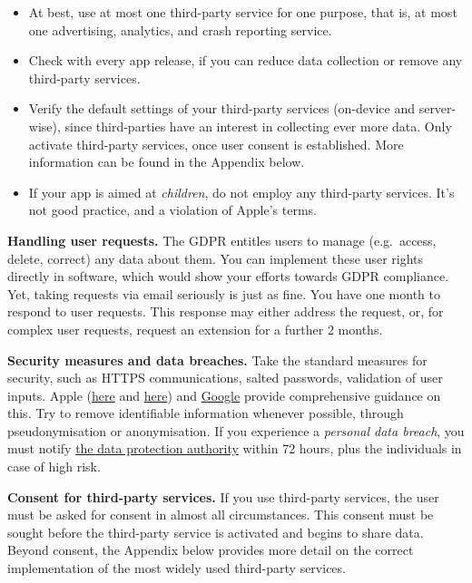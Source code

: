 \documentclass[
]{book}
\providecommand{\tightlist}{%
  \setlength{\itemsep}{0pt}\setlength{\parskip}{0pt}}
\begin{document}
\begin{itemize}
\tightlist
\item
  At best, use at most one third-party service for one purpose, that is, at most one advertising, analytics, and crash reporting service.
\item
  Check with every app release, if you can reduce data collection or remove any third-party services.
\item
  Verify the default settings of your third-party services (on-device and server-wise), since third-parties have an interest in collecting ever more data. Only activate third-party services, once user consent is established. More information can be found in the Appendix below.
\item
  If your app is aimed at \emph{children}, do not employ any third-party services. It's not good practice, and a violation of Apple's terms.
\end{itemize}

\textbf{Handling user requests.} The GDPR entitles users to manage (e.g.~access, delete, correct) any data about them. You can implement these user rights directly in software, which would show your efforts towards GDPR compliance. Yet, taking requests via email seriously is just as fine. You have one month to respond to user requests. This response may either address the request, or, for complex user requests, request an extension for a further 2 months.

\textbf{Security measures and data breaches.} Take the standard measures for security, such as HTTPS communications, salted passwords, validation of user inputs. Apple (\href{https://developer.apple.com/documentation/security}{here} and \href{https://developer.apple.com/library/archive/documentation/Security/Conceptual/SecureCodingGuide}{here}) and \href{https://developer.android.com/training/articles/security-tips}{Google} provide comprehensive guidance on this. Try to remove identifiable information whenever possible, through pseudonymisation or anonymisation. If you experience a \emph{personal data breach}, you must notify \href{https://edpb.europa.eu/about-edpb/board/members}{the data protection authority} within 72 hours, plus the individuals in case of high risk.

\textbf{Consent for third-party services.} If you use third-party services, the user must be asked for consent in almost all circumstances. This consent must be sought before the third-party service is activated and begins to share data. Beyond consent, the Appendix below provides more detail on the correct implementation of the most widely used third-party services.
\end{document}
